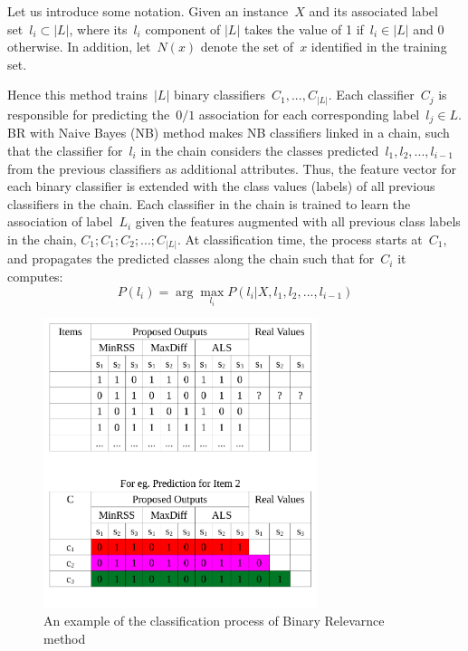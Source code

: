 \documentclass[11pt]{article}
\begin{document}
Let us introduce some notation. Given an instance~$X$ and its associated label set~$l_i \subset |L|$, where its~$l_i$ component of  $ |L|$ takes the value of 1 if~$l_i \in |L|$ and 0 otherwise. In addition, let~$N(x)$ denote the set of~$x$ identified in the training set.

Hence this method trains~$|L|$ binary classifiers~$C_1,...,C_{|L|}$. Each classifier~$C_j$ is responsible for predicting the~$0/1$ association for each corresponding label~$l_j \in L$.\\

BR with Naive Bayes (NB) method makes NB classifiers linked in a chain, such that the classifier for~$l_{i}$ in the chain considers the classes predicted~$l_1,l_2,...,l_{i-1}$ from the previous classifiers as additional attributes. Thus, the feature vector for each binary classifier is extended with the class values (labels) of all previous classifiers in the chain. Each classifier in the chain is trained to learn the association of label~$L_i$
given the features augmented with all previous class labels in the chain, $ C_1;C_1;C_2;...;C_{|L|}$. At classification time, the process starts at~$C_1$, and propagates the predicted classes along   the   chain   such   that   for~$C_i$ it   computes: 
\begin{equation}
P(l_i)= \arg \max_{l_i} P(l_i|X,l_1,l_2,...,l_{i-1}) 
\end{equation}

\begin{figure}[h]
  \centering
    \includegraphics[width=8cm]{graph/BR.pdf}
  \caption{An example of the classification process of Binary Relevarnce method}\label{fig:BR}
\end{figure}
\end{document}
